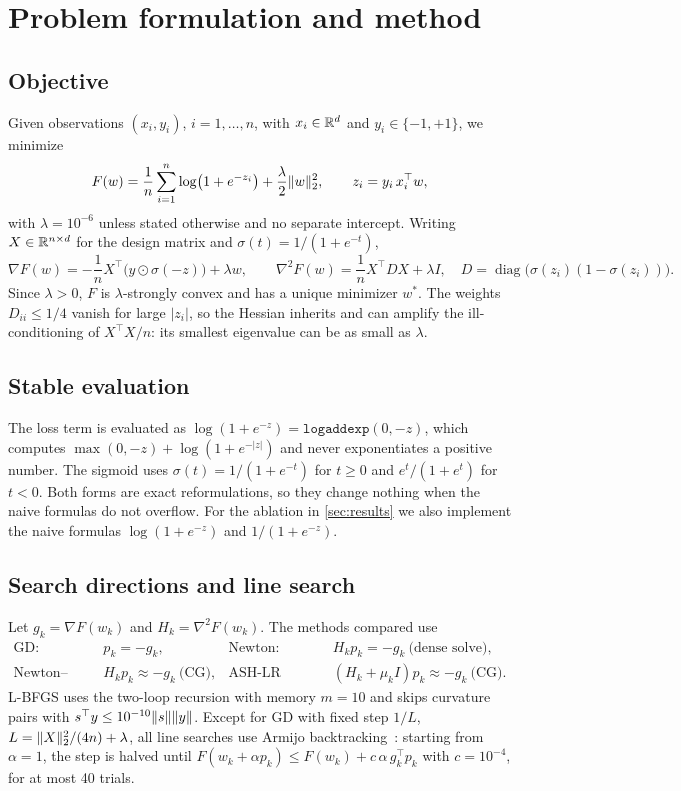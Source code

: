 \section{Problem formulation and method}\label{sec:method}

\subsection{Objective}
Given observations $(x_i,y_i)$, $i=1,\dots,n$, with $x_i\in\mathbb{R}^d$ and
$y_i\in\{-1,+1\}$, we minimize
\begin{equation}\label{eq:obj}
  F(w)=\frac1n\sum_{i=1}^n \log\bigl(1+e^{-z_i}\bigr)+\frac\lambda2\lVert w\rVert_2^2,
  \qquad z_i=y_i\,x_i^\top w,
\end{equation}
with $\lambda=10^{-6}$ unless stated otherwise and no separate intercept. Writing
$X\in\mathbb{R}^{n\times d}$ for the design matrix and $\sigma(t)=1/(1+e^{-t})$,
\begin{equation}\label{eq:derivs}
  \nabla F(w)=-\frac1n X^\top\bigl(y\odot\sigma(-z)\bigr)+\lambda w,\qquad
  \nabla^2F(w)=\frac1n X^\top D X+\lambda I,\quad D=\operatorname{diag}\bigl(\sigma(z_i)(1-\sigma(z_i))\bigr).
\end{equation}
Since $\lambda>0$, $F$ is $\lambda$-strongly convex and has a unique minimizer $w^*$.
The weights $D_{ii}\le 1/4$ vanish for large $|z_i|$, so the Hessian inherits and
can amplify the ill-conditioning of $X^\top X/n$: its smallest eigenvalue can be as
small as $\lambda$.

\subsection{Stable evaluation}
The loss term is evaluated as $\log(1+e^{-z})=\texttt{logaddexp}(0,-z)$, which
computes $\max(0,-z)+\log(1+e^{-|z|})$ and never exponentiates a positive number.
The sigmoid uses $\sigma(t)=1/(1+e^{-t})$ for $t\ge0$ and $e^{t}/(1+e^{t})$ for
$t<0$. Both forms are exact reformulations, so they change nothing when the naive
formulas do not overflow. For the ablation in \cref{sec:results} we also implement the
naive formulas $\log(1+e^{-z})$ and $1/(1+e^{-z})$.

\subsection{Search directions and line search}
Let $g_k=\nabla F(w_k)$ and $H_k=\nabla^2F(w_k)$. The methods compared use
\begin{align*}
  \text{GD:}&\quad p_k=-g_k, &
  \text{Newton:}&\quad H_kp_k=-g_k \ \text{(dense solve)},\\
  \text{Newton--CG:}&\quad H_kp_k\approx-g_k \ \text{(CG)}, &
  \text{ASH-LR (phase 2):}&\quad (H_k+\mu_kI)p_k\approx-g_k \ \text{(CG)}.
\end{align*}
L-BFGS uses the two-loop recursion with memory $m=10$ and skips curvature pairs
with $s^\top y\le10^{-10}\lVert s\rVert\lVert y\rVert$. Except for GD with fixed step $1/L$,
$L=\lVert X\rVert_2^2/(4n)+\lambda$, all line searches use Armijo
backtracking~\cite{wright2022optimization}: starting from $\alpha=1$, the step is
halved until $F(w_k+\alpha p_k)\le F(w_k)+c\,\alpha\, g_k^\top p_k$ with $c=10^{-4}$,
for at most 40 trials.

